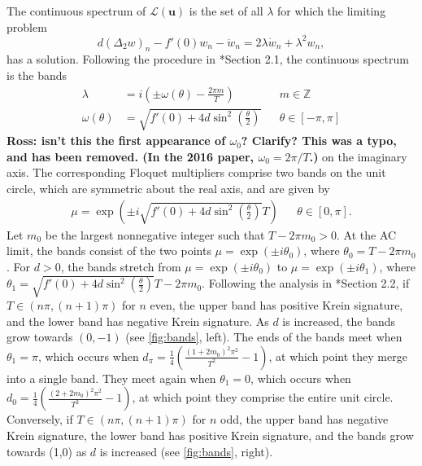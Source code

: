 \documentclass[12pt,reqno]{amsart}
\def\Z{{\mathbb Z}}
\def\calL{\mathcal{L}}
\newcommand{\uvec}{\mathbf{u}}
\theoremstyle{definition}
\begin{document}
The continuous spectrum of $\calL(\uvec)$ is the set of all $\lambda$ for which the limiting problem 
\begin{equation}\label{eq:DKGeigcont}
d (\Delta_2 w)_n - f'(0)w_n - \ddot{w}_n = 2 \lambda \dot{w}_n + \lambda^2 w_n,
\end{equation}
has a solution. Following the procedure in \cite{cuevas-maraver2016}*{Section 2.1}, the continuous spectrum is the bands
\begin{equation}\label{eq:contspec}
\begin{aligned}
\lambda &= i\left( \pm \omega(\theta) - \frac{2 \pi m}{T} \right) && m \in \Z \\
\omega(\theta) &= \sqrt{ f'(0) + 4 d \sin^2\left( \frac{\theta}{2} \right) } && \theta \in [-\pi, \pi]
\end{aligned}
\end{equation}
{\bf Ross: isn't this the first appearance of $\omega_0$? Clarify? This was a typo, and has been removed. (In the 2016 paper, $\omega_0 = 2\pi/T$.)}
on the imaginary axis. The corresponding Floquet multipliers comprise two bands on the unit circle,  which are symmetric about the real axis, and are given by
\begin{equation}\label{eq:contspecmult}
\begin{aligned}
\mu = \exp \left( \pm i \sqrt{f'(0) + 4 d \sin^2 \left(\frac{\theta}{2}\right) }T \right)  && \theta \in [0, \pi].
\end{aligned}
\end{equation}
Let $m_0$ be the largest nonnegative integer such that $T - 2 \pi m_0 > 0$. At the AC limit, the bands consist of the two points $\mu = \exp(\pm i \theta_0)$, where $\theta_0 =  T - 2 \pi m_0$. For $d>0$, the bands stretch from $\mu = \exp(\pm i \theta_0)$ to $\mu = \exp(\pm i \theta_1)$, where $\theta_1 = \sqrt{f'(0) + 4 d \sin^2 \left(\frac{\theta}{2}\right) }T - 2 \pi m_0$. Following the analysis in \cite{cuevas-maraver2016}*{Section 2.2}, if $T \in (n \pi, (n+1)\pi)$ for $n$ even, the upper band has positive Krein signature, and the lower band has negative Krein signature. As $d$ is increased, the bands grow towards $(0,-1)$ (see \cref{fig:bands}, left). The ends of the bands meet when $\theta_1 = \pi$, which occurs when $d_{\pi} = \frac{1}{4} \left( \frac{(1 + 2 m_0)^2 \pi^2}{T^2} - 1\right)$, at which point they merge into a single band. They meet again when $\theta_1 = 0$, which occurs when $d_0 = \frac{1}{4} \left( \frac{(2 + 2 m_0)^2 \pi^2}{T^2} - 1\right)$, at which point they comprise the entire unit circle.
Conversely, if $T \in (n \pi, (n+1)\pi)$ for $n$ odd, the upper band has negative Krein signature, the lower band has positive Krein signature, and the bands grow towards (1,0) as $d$ is increased (see \cref{fig:bands}, right).
\end{document}
